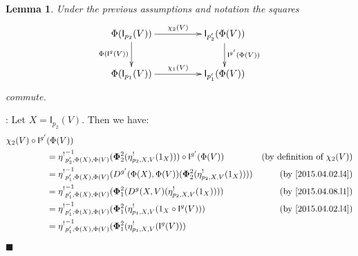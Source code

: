 \documentclass[12pt]{article}
\numberwithin{equation}{section}
\newenvironment{myproof}{{\bf Proof}:}{$\blacksquare$ \vskip 5mm }
\newtheorem{lemma}[proposition]{Lemma}
\newcommand{\by}[1]{\text{(by #1)}}
\newcommand{\id}{1}            %
\newcommand{\I}{\mathsf{I}}
\newcommand{\etashriek}{\eta^!}
\newcommand{\etaunshriek}{{\etashriek}^{-1}}
\begin{document}
\begin{lemma}
\label{2015.04.06.l7} Under the previous assumptions and notation the squares
%
$$
\begin{xy}
          \xymatrix@C=4pc{ \Phi(\I_{p_2}(V)) \ar[r]^-{\chi_2(V)}
            \ar[d]_{\Phi(\I^g(V))} & \I_{p_2'}(\Phi(V))
            \ar[d]^{\I^{g'}(\Phi(V))}\\ \Phi(\I_{p_1}(V)) \ar[r]^{\chi_1(V)} &
            \I_{p_1'}(\Phi(V)) }
\end{xy}
$$
%
commute.
\end{lemma}
%
\begin{myproof}
Let $X=\I_{p_2}(V)$.  Then we have:
%
\begin{align*}
  \chi_2(V) \circ \I^{g'}&(\Phi(V)) \\
  & = \etaunshriek_{p'_2,\Phi(X),\Phi(V)}({\bf\Phi}_2^2(\etashriek_{p_2,X,V}(\id_X))) \circ \I^{g'}(\Phi(V)) & \by{definition of $\chi_2(V)$} \\
  & = \etaunshriek_{p'_1,\Phi(X),\Phi(V)}(D^{g'}(\Phi(X),\Phi(V))({\bf\Phi}_2^2(\etashriek_{p_2,X,V}(\id_X)))) & \by{\ref{2015.04.02.l4}} \\
  & = \etaunshriek_{p'_1,\Phi(X),\Phi(V)}({\bf\Phi}_1^2(D^g(X,V)(\etashriek_{p_2,X,V}(\id_X)))) & \by{\ref{2015.04.08.l1}} \\
  & = \etaunshriek_{p'_1,\Phi(X),\Phi(V)}({\bf\Phi}_1^2(\etashriek_{p_1,X,V}(\id_X \circ \I^g(V)))  & \by{\ref{2015.04.02.l4}} \\
  & = \etaunshriek_{p'_1,\Phi(X),\Phi(V)}({\bf\Phi}_1^2(\etashriek_{p_1,X,V}(\I^g(V)))
\end{align*}


\end{myproof}
\end{document}

